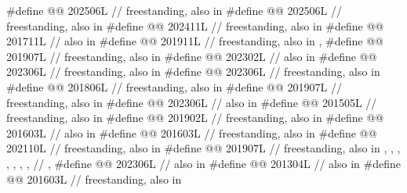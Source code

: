 \begin{codeblock}
#define @@                    202506L // freestanding, also in 
#define @@                 202506L // freestanding, also in 
#define @@                        202411L // freestanding, also in 
#define @@                 201711L // also in 
#define @@       201911L // freestanding, also in , 
#define @@                       201907L // freestanding, also in 
#define @@                           202302L // also in 
#define @@                         202306L // freestanding, also in 
#define @@                        202306L // freestanding, also in 
#define @@                          201806L // freestanding, also in 
#define @@                            201907L // freestanding, also in 
#define @@                            202306L // also in 
#define @@                     201505L // freestanding, also in 
#define @@              201902L // freestanding, also in 
#define @@              201603L // also in 
#define @@                              201603L // freestanding, also in 
#define @@                          202110L // freestanding, also in 
#define @@                           201907L
  // freestanding, also in , , , , , , ,
  // , 
#define @@                            202306L // also in 
#define @@                       201304L // also in 
#define @@                             201603L // freestanding, also in 

\end{codeblock}
